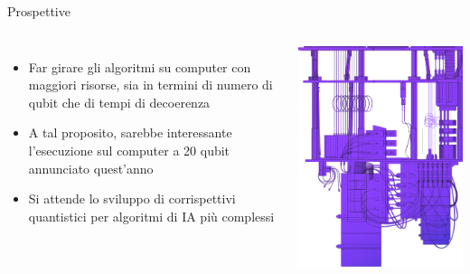 \documentclass{beamer}
\begin{document}
    \begin{frame}{Prospettive}
        \begin{columns}
            \begin{itemize}
                \item Far girare gli algoritmi su computer con maggiori risorse, sia in termini di numero di qubit che di tempi di decoerenza
                \item A tal proposito, sarebbe interessante l'esecuzione sul computer a 20 qubit annunciato quest'anno
                \item Si attende lo sviluppo di corrispettivi quantistici per algoritmi di IA più complessi
            \end{itemize}
            \includegraphics[width=\linewidth]{gfx/quantum_computer.png}
        \end{columns}
    \end{frame}
\end{document}
